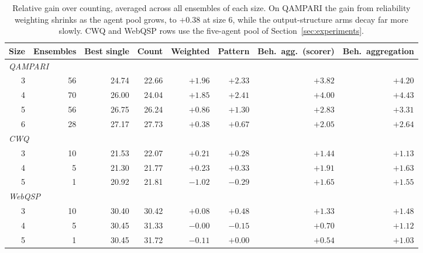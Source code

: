 \documentclass[11pt]{article}
\begin{document}
\begin{table}[t]
  \caption{Relative gain over counting, averaged across all ensembles of each size. On QAMPARI the gain from reliability weighting shrinks as the agent pool grows, to $+0.38$ at size 6, while the output-structure arms decay far more slowly. CWQ and WebQSP rows use the five-agent pool of Section~\ref{sec:experiments}.}
  \label{tab:ens-gain}
  \centering
  \begin{tabular}{rrrrrrrr}
    \toprule
    Size & Ensembles & Best single & Count & Weighted & Pattern & Beh.\ agg.\ (scorer) & Beh.\ aggregation \\
    \midrule
    \multicolumn{8}{l}{\emph{QAMPARI}} \\
    3 & 56 & 24.74 & 22.66 & $+1.96$ & $+2.33$ & $+3.82$ & $\mathbf{+4.20}$ \\
    4 & 70 & 26.00 & 24.04 & $+1.85$ & $+2.41$ & $+4.00$ & $\mathbf{+4.43}$ \\
    5 & 56 & 26.75 & 26.24 & $+0.86$ & $+1.30$ & $+2.83$ & $\mathbf{+3.31}$ \\
    6 & 28 & 27.17 & 27.73 & $+0.38$ & $+0.67$ & $+2.05$ & $\mathbf{+2.64}$ \\
    \midrule
    \multicolumn{8}{l}{\emph{CWQ}} \\
    3 & 10 & 21.53 & 22.07 & $+0.21$ & $+0.28$ & $+1.44$ & $\mathbf{+1.13}$ \\
    4 &  5 & 21.30 & 21.77 & $+0.23$ & $+0.33$ & $+1.91$ & $\mathbf{+1.63}$ \\
    5 &  1 & 20.92 & 21.81 & $-1.02$ & $-0.29$ & $+1.65$ & $\mathbf{+1.55}$ \\
    \midrule
    \multicolumn{8}{l}{\emph{WebQSP}} \\
    3 & 10 & 30.40 & 30.42 & $+0.08$ & $+0.48$ & $+1.33$ & $\mathbf{+1.48}$ \\
    4 &  5 & 30.45 & 31.33 & $-0.00$ & $-0.15$ & $+0.70$ & $\mathbf{+1.12}$ \\
    5 &  1 & 30.45 & 31.72 & $-0.11$ & $+0.00$ & $+0.54$ & $\mathbf{+1.03}$ \\
    \bottomrule
  \end{tabular}
\end{table}
\end{document}

